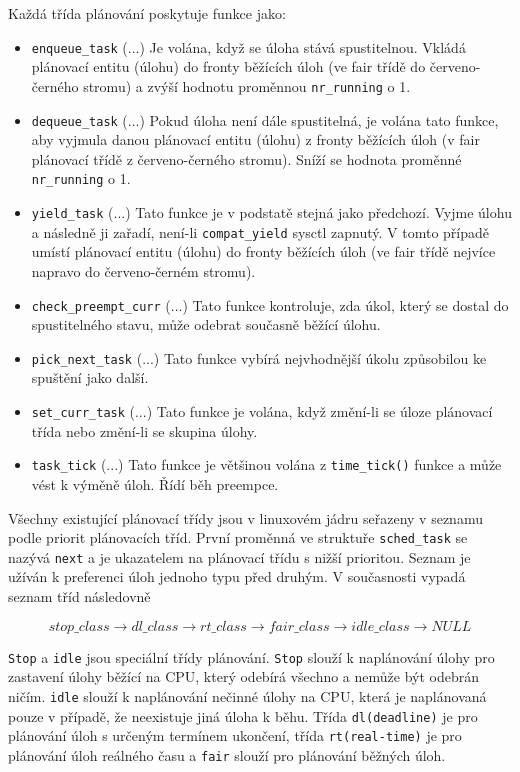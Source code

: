 \documentclass[a4paper,12pt]{article}
\begin{document}
\newpage
\noindent
Každá třída plánování poskytuje funkce jako:
\begin{itemize}
\item \verb#enqueue_task# (...) 
Je volána, když se úloha stává spustitelnou. Vkládá plánovací entitu (úlohu) do fronty běžících úloh (ve fair třídě do červeno-černého stromu) a zvýší hodnotu proměnnou \verb#nr_running# o 1.
\item \verb#dequeue_task# (...) 
Pokud úloha není dále spustitelná, je volána tato funkce, aby vyjmula danou plánovací entitu (úlohu) z fronty běžících úloh (v fair plánovací třídě z červeno-černého stromu). Sníží se hodnota proměnné \verb#nr_running# o 1.
\item \verb#yield_task# (...) 
Tato funkce je v podstatě stejná jako předchozí. Vyjme úlohu a následně ji zařadí, není-li \verb#compat_yield# sysctl zapnutý. V tomto případě umístí plánovací entitu (úlohu) do fronty běžících úloh (ve fair třídě nejvíce napravo do červeno-černém stromu).
\item \verb#check_preempt_curr# (...) 
Tato funkce kontroluje, zda úkol, který se dostal do spustitelného stavu, může odebrat současně běžící úlohu.
\item \verb#pick_next_task# (...) 
Tato funkce vybírá nejvhodnější úkolu způsobilou ke spuštění jako další.
\item \verb#set_curr_task# (...) 
Tato funkce je volána, když změní-li se úloze plánovací třída nebo změní-li se skupina úlohy.
\item \verb#task_tick# (...) 
Tato funkce je většinou volána z \verb#time_tick()# funkce a může vést k výměně úloh. Řídí běh preempce. 
\end{itemize}

Všechny existující plánovací třídy jsou v linuxovém jádru seřazeny v seznamu podle priorit plánovacích tříd. První proměnná ve struktuře \verb#sched_task# se nazývá \verb#next# a je ukazatelem na plánovací třídu s nižší prioritou. Seznam je užíván k preferenci úloh jednoho typu před druhým. V současnosti vypadá seznam tříd následovně

$$ 
stop\_class \rightarrow dl\_class \rightarrow rt\_class \rightarrow fair\_class \rightarrow idle\_class \rightarrow NULL 
$$

\verb#Stop# a \verb#idle# jsou speciální třídy plánování. \verb#Stop# slouží k naplánování úlohy pro zastavení úlohy běžící na CPU, který odebírá všechno a nemůže být odebrán ničím. \verb#idle# slouží k naplánování nečinné úlohy na CPU, která je naplánovaná pouze v případě, že neexistuje jiná úloha k běhu. Třída \verb#dl(deadline)# je pro plánování úloh s určeným termínem ukončení, třída \verb#rt(real-time)# je pro plánování úloh reálného času a \verb#fair# slouží pro plánování běžných úloh.
\end{document}
